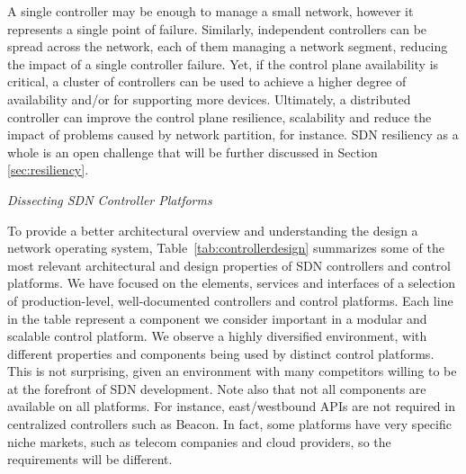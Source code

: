A single controller may be enough to manage a small network, however it represents a single point 
of failure.
Similarly, independent controllers can be spread across the network, each of them managing 
a network segment, reducing the impact of a single controller failure. Yet, if the control plane
availability is critical, a cluster of controllers can be used to achieve a higher degree of availability 
and/or for supporting more devices.
Ultimately, a distributed controller can improve the control plane 
resilience, scalability and reduce the impact of problems caused by network partition, for instance.
SDN resiliency as a whole is an open challenge that will be further discussed in Section \ref{sec:resiliency}.

\vspace{2mm}
\noindent \textit{Dissecting SDN Controller Platforms}
\vspace{2mm}


To provide a better architectural overview and understanding the design a network operating system, Table~\ref{tab:controllerdesign} summarizes some of the most relevant architectural and design properties of 
SDN controllers and control platforms. 
We have focused on the elements, services and interfaces of a selection of production-level, well-documented controllers and control platforms.
Each line in the table represent a component we consider important in a modular and scalable control platform.
We observe a highly diversified environment, with different properties and components being used by distinct control platforms.
This is not surprising, given an environment with many competitors willing to be at the forefront of SDN development.
Note also that not all components are available on all platforms.
For instance, east/westbound APIs are not required in centralized controllers such as Beacon. 
In fact, some platforms have very specific niche markets, such as telecom companies and cloud providers, so the requirements will be different.


